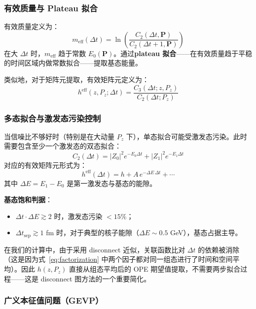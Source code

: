 \documentclass[11pt,a4paper]{ctexart}
\begin{document}
\subsubsection{有效质量与 Plateau 拟合}

有效质量定义为：
\begin{equation}
m_{\text{eff}}(\Delta t) = \ln\!\left( \frac{C_2(\Delta t, \mathbf{P})}{C_2(\Delta t+1, \mathbf{P})} \right)
\end{equation}
在大 $\Delta t$ 时，$m_{\text{eff}}$ 趋于常数 $E_0(\mathbf{P})$。通过\textbf{plateau 拟合}——在有效质量趋于平稳的时间区域内做常数拟合——提取基态能量。

类似地，对于矩阵元提取，有效矩阵元定义为：
\begin{equation}
h^{\text{eff}}(z, P_z; \Delta t) = \frac{C_3(\Delta t; z, P_z)}{C_2(\Delta t; P_z)}
\end{equation}

\subsubsection{多态拟合与激发态污染控制}

当信噪比不够好时（特别是在大动量 $P_z$ 下），单态拟合可能受激发态污染。此时需要包含至少一个激发态的双态拟合：
\begin{equation}
C_2(\Delta t) = |Z_0|^2 e^{-E_0 \Delta t} + |Z_1|^2 e^{-E_1 \Delta t}
\end{equation}
对应的有效矩阵元形式为：
\begin{equation}
h^{\text{eff}}(\Delta t) = h + A \, e^{-\Delta E \, \Delta t} + \cdots
\end{equation}
其中 $\Delta E = E_1 - E_0$ 是第一激发态与基态的能隙。

\textbf{基态饱和判据}：
\begin{itemize}
  \item $\Delta t \cdot \Delta E \gtrsim 2$ 时，激发态污染 $< 15\%$；
  \item $\Delta t_{\text{sep}} \gtrsim 1$ fm 时，对于典型的核子能隙（$\Delta E \sim 0.5$ GeV），基态占据主导。
\end{itemize}

在我们的计算中，由于采用 disconnect 近似，关联函数比对 $\Delta t$ 的依赖被消除（这是因为式~\eqref{eq:factorization} 中两个因子都对同一组态进行了时间和空间平均）。因此 $h(z, P_z)$ 直接从组态平均后的 OPE 期望值提取，不需要两步拟合过程——这是 disconnect 图方法的一个重要简化。

\subsubsection{广义本征值问题（GEVP）}
\end{document}
